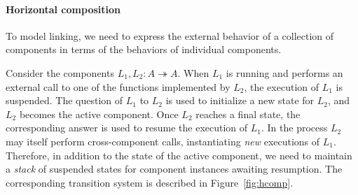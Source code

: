 \documentclass[11pt,oneside]{book}
\theoremstyle{definition}
\newcommand{\kw}[1]{\ensuremath{ \mathsf{#1} }}
\newcommand{\que}{\circ}         %
\newcommand{\ans}{\bullet}       %
\begin{document}


\paragraph{Horizontal composition} \label{sec:sem:linker} %

To model linking,
we need to express the external behavior
of a collection of components
in terms of the behaviors of
individual components.

Consider the components $L_1, L_2 : A \twoheadrightarrow A$.
When $L_1$ is running and performs an external call
to one of the functions implemented by $L_2$,
the execution of $L_1$ is suspended.
The question of $L_1$ to $L_2$
is used to initialize a new state for $L_2$,
and $L_2$ becomes the active component.
Once $L_2$ reaches a final state,
the corresponding answer is used to resume
the execution of $L_1$.
In the process
$L_2$ may itself perform cross-component calls,
instantiating \emph{new} executions of $L_1$.
Therefore,
in addition to the state of the active component,
we need to maintain a \emph{stack} of suspended states
for component instances awaiting resumption.
The corresponding transition system
is described in Figure~\ref{fig:hcomp}.
\end{document}
